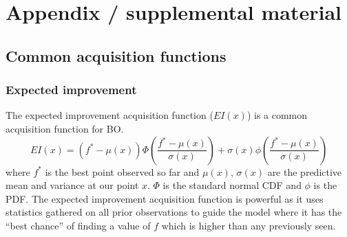 \documentclass{article}
\newcommand{\bfx}{\textbf{x}}
\begin{document}


\nocite{*}



\appendix

\section{Appendix / supplemental material}

\subsection{Common acquisition functions}
\subsubsection{Expected improvement}
The expected improvement acquisition function ($EI(x)$) is a common acquisition function for BO. 
\[EI(x) = (f^* - \mu(x))\Phi \left( \frac{f^* - \mu(x)}
{\sigma(x)}\right) + \sigma(x)\phi \left(\frac{f^* - \mu(x)}
{\sigma(x)}\right)\]
where $f^*$ is the best point observed so far and $\mu(x)$, $\sigma(x)$ are the predictive mean and variance at our point $x$. $\Phi$ is the standard normal CDF and $\phi$ is the PDF. The expected improvement acquisition function is powerful as it uses statistics gathered on all prior observations to guide the model where it has the ``best chance'' of finding a value of $f$ which is higher than any previously seen.
\end{document}
